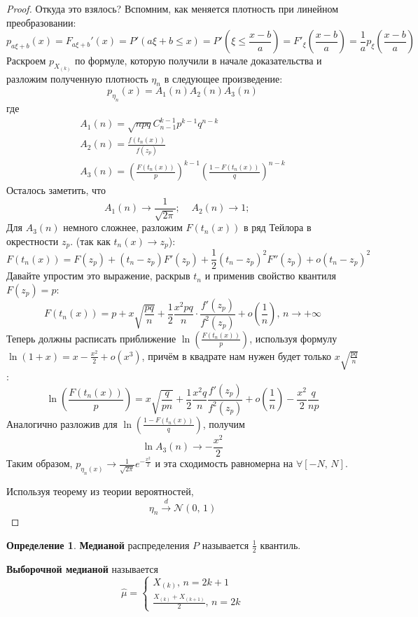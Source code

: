 \documentclass[a4paper,12pt]{article}
\renewcommand{\leq}{\ensuremath{\leqslant}}
\theoremstyle{plain}
\theoremstyle{definition}
\newtheorem{definition}{Определение}[section]
\theoremstyle{remark}
\begin{document}
\begin{proof}
  Откуда это взялось? Вспомним, как меняется плотность при линейном преобразовании:
  \[
    p_{a\xi + b}(x) = F_{a\xi + b}'(x) = P'(a\xi + b \leq x) = P'\left(\xi \leq \frac{x - b}{a}\right) = F'_\xi\left(\frac{x - b}{a}\right) = \frac{1}{a}p_\xi\left(\frac{x - b}{a}\right)
  \]
  Раскроем $p_{X_{(k)}}$ по формуле, которую получили в начале доказательства и разложим полученную плотность $\eta_n$ в следующее произведение:
  \[
    p_{\eta_n}(x) = A_1(n)A_2(n)A_3(n)
  \]
  где 
  \begin{align*}
  A_1(n) = \sqrt{npq}C_{n - 1}^{k - 1}p^{k - 1}q^{n - k}\\
  A_2(n) = \frac{f(t_n(x))}{f(z_p)}\\
  A_3(n) = \left(\frac{F(t_n(x))}{p}\right)^{k - 1}\left(\frac{1 - F(t_n(x))}{q}\right)^{n - k}
  \end{align*}
  Осталось заметить, что
  \[
    A_1(n) \to \frac{1}{\sqrt{2\pi}};\;\;\;\; A_2(n) \to 1;\;\;\;\; 
  \]
  Для $A_3(n)$ немного сложнее, разложим $F(t_n(x))$ в ряд Тейлора в окрестности $z_p$. (так как $t_n(x) \to z_p$):
  \[
    F(t_n(x)) = F(z_p) + (t_n - z_p)F'(z_p) + \frac{1}{2}(t_n - z_p)^2F''(z_p) + o(t_n - z_p)^2
  \]
  Давайте упростим это выражение, раскрыв $t_n$ и применив свойство квантиля $F(z_p) = p$:
  \[
    F(t_n(x)) = p + x\sqrt{\frac{pq}{n}} + \frac{1}{2}\frac{x^2pq}{n}\cdot\frac{f'(z_p)}{f^2(z_p)} + o\left(\frac{1}{n}\right),\, n \to +\infty
  \]
  Теперь должны расписать приближение $\ln\left(\frac{F(t_n(x))}{p}\right)$, используя формулу $\ln(1 + x) = x - \frac{x^2}{2} + o(x^3)$, причём в квадрате нам нужен будет только $x\sqrt{\frac{pq}{n}}$:
  \[
    \ln\left(\frac{F(t_n(x))}{p}\right) = x\sqrt{\frac{q}{pn}} + \frac{1}{2}\frac{x^2q}{n}\frac{f'(z_p)}{f^2(z_p)} + o\left(\frac{1}{n}\right) - \frac{x^2}{2}\frac{q}{np}
  \]
  Аналогично разложив для $\ln\left(\frac{1 - F(t_n(x))}{q}\right)$, получим
  \[
    \ln A_3(n) \to -\frac{x^2}{2}
  \]
  Таким образом, $p_{\eta_n(x)} \to \frac{1}{\sqrt{2\pi}}e^{-\frac{x^2}{2}}$ и эта сходимость равномерна на $\forall [-N,\, N]$.

  Используя теорему из теории вероятностей,
  \[
    \eta_n \overset{d}{\to} \mathcal{N}(0,\, 1)
  \]
\end{proof}

\begin{definition}
  \textbf{Медианой} распределения $P$ называется $\frac{1}{2}$ квантиль.

  \textbf{Выборочной медианой} называется
  \[
    \hat{\mu} = \begin{cases}
      X_{(k)},\, n = 2k + 1\\
      \frac{X_{(k)} + X_{(k + 1)}}{2},\, n = 2k
    \end{cases}
  \]
\end{definition}
\end{document}
